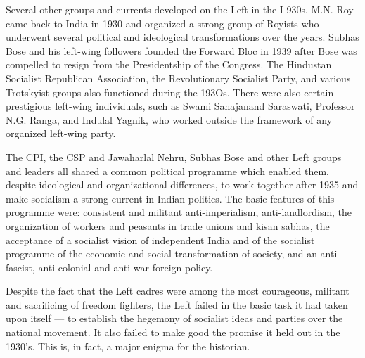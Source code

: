 \begin{multicols}{2}
Several other groups and currents developed on the Left in the I 930s. M.N. Roy came back to India in 1930 and organized a strong group of Royists who underwent several political and ideological transformations over the years. Subhas Bose and his left-wing followers founded the Forward Bloc in 1939 after Bose was compelled to resign from the Presidentship of the Congress. The Hindustan Socialist Republican Association, the Revolutionary Socialist Party, and various Trotskyist groups also functioned during the 193Os. There were also certain prestigious left-wing individuals, such as Swami Sahajanand Saraswati, Professor N.G. Ranga, and Indulal Yagnik, who worked outside the framework of any organized left-wing party. 

The CPI, the CSP and Jawaharlal Nehru, Subhas Bose and other Left groups and leaders all shared a common political programme which enabled them, despite ideological and organizational differences, to work together after 1935 and make socialism a strong current in Indian politics. The basic features of this programme were: consistent and militant anti-imperialism, anti-landlordism, the organization of workers and peasants in trade unions and kisan sabhas, the acceptance of a socialist vision of independent India and of the socialist programme of the economic and social transformation of society, and an anti-fascist, anti-colonial and anti-war foreign policy. 

Despite the fact that the Left cadres were among the most courageous, militant and sacrificing of freedom fighters, the Left failed in the basic task it had taken upon itself --- to establish the hegemony of socialist ideas and parties over the national movement. It also failed to make good the promise it held out in the 1930's. This is, in fact, a major enigma for the historian. 


\end{multicols}
